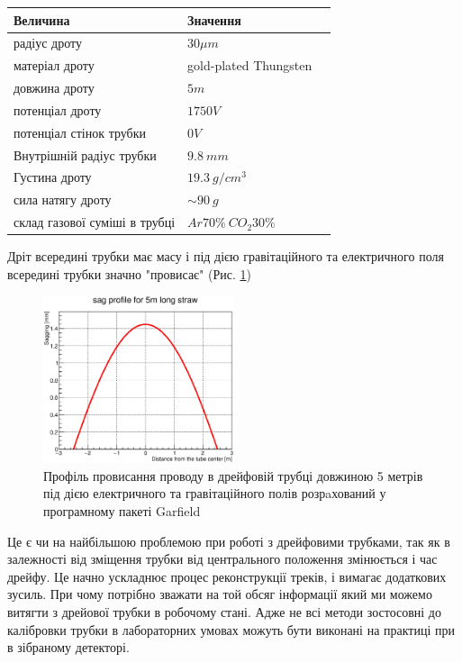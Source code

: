 \documentclass[]{article}
\begin{document}
	\begin{tabular}{|l|l|p{8cm}|}
		\hline
		Величина & Значення\\
		\hline
		радіус дроту & $30\mu m$\\
		\hline
		матеріал дроту & gold-plated Thungsten\\
		\hline
		довжина дроту & $5m$ \\
		\hline
		потенціал дроту & $1750 V$ \\
		\hline
		потенціал стінок трубки & $0 V$ \\
		\hline
		Внутрішній радіус трубки & $9.8~mm$ \\
		\hline
		Густина дроту & $19.3 ~g/cm^3$ \\
		\hline
		сила натягу дроту & $\sim 90~g$ \\
		\hline
		склад газової суміші в трубці & $Ar70\% ~CO_2 30\%$ \\
		\hline
	\end{tabular}
	
	Дріт всередині трубки має масу і під дією гравітаційного та електричного поля всередині трубки значно "провисає" (Рис. \ref{fig:sagProfile})
	
	\begin{figure}[h]
	\centering
	\includegraphics[width=0.5\textwidth]{sagProfileFit.eps}
	\caption{Профіль провисання проводу в дрейфовій трубці довжиною 5 метрів під дією електричного та гравітаційного полів розрaхований у програмному пакеті Garfield }
	\label{fig:sagProfile}
	\end{figure}	
	
	Це є чи на найбільшою проблемою при роботі з дрейфовими трубками, так як в залежності від зміщення трубки від центрального положення змінюється і час дрейфу. Це начно ускладнює процес реконструкції треків, і вимагає додаткових зусиль. При чому потрібно зважати на той обсяг інформації який ми можемо витягти з дрейової трубки в робочому стані. Адже не всі методи зостосовні до калібровки трубки в лабораторних умовах можуть бути виконані на практиці при в зібраному детекторі.
	
\end{document}
